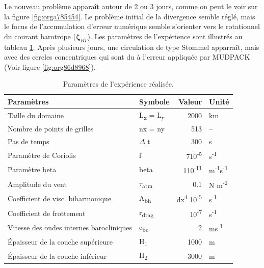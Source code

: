 \documentclass[10pt]{report}
\numberwithin{equation}{section}
\begin{document}
Le nouveau problème apparaît autour de 2 ou 3 jours, comme on peut le voir sur la figure \ref{fig:orga785454}.
Le problème initial de la divergence semble réglé, mais le focus de l'accumulation d'erreur numérique semble s'orienter vers le rotationnel du courant barotrope (\(\boldsymbol{\zeta}_{BT}\)).
Les paramètres de l'expérience sont illustrés au tableau \ref{tab:orge32a7f4}.
Après plusieurs jours, une circulation de type Stommel apparraît, mais avec des cercles concentriques qui sont du à l'erreur appliquée par MUDPACK (Voir figure \ref{fig:org86d8968}).

\begin{table}[htbp]
\caption{\label{tab:orge32a7f4}Paramètres de l'expérience réalisée.}
\centering
\begin{tabular}{llrl}
\hline
\hline
Paramètres & Symbole & Valeur & Unité\\[0pt]
\hline
Taille du domaine & L\textsubscript{x} = L\textsubscript{y} & 2000 & km\\[0pt]
Nombre de points de grilles & nx = ny & 513 & --\\[0pt]
Pas de temps & \(\Delta\) t & 300 & s\\[0pt]
Paramètre de Coriolis & f & 7\texttimes{}10\textsuperscript{-5} & s\textsuperscript{-1}\\[0pt]
Paramètre beta & beta & 1\texttimes{}10\textsuperscript{-11} & m\textsuperscript{-1}s\textsuperscript{-1}\\[0pt]
Amplitude du vent & \(\tau\)\textsubscript{atm} & 0.1 & N m\textsuperscript{-2}\\[0pt]
Coefficient de visc. biharmonique & A\textsubscript{bh} & dx\textsuperscript{4} \texttimes{}10\textsuperscript{-5} & s\textsuperscript{-1}\\[0pt]
Coefficient de frottement & r\textsubscript{drag} & 10\textsuperscript{-7} & s\textsuperscript{-1}\\[0pt]
Vitesse des ondes internes barocliniques & c\textsubscript{bc} & 2 & ms\textsuperscript{-1}\\[0pt]
Épaisseur de la couche supérieure & H\textsubscript{1} & 1000 & m\\[0pt]
Épaisseur de la couche inférieur & H\textsubscript{2} & 3000 & m\\[0pt]
\hline
\end{tabular}
\end{table}
\end{document}
